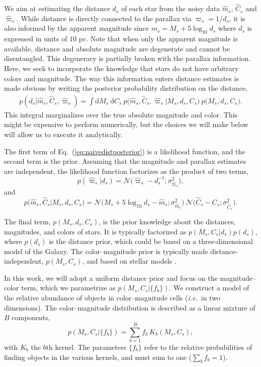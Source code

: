 \documentclass[manuscript, letterpaper]{aastex6}
\newcommand{\ie}{{\textit{i.e.}~}}
\newcommand{\eg}{{\textit{e.g.},~}}
\newcommand{\equref}[1]{{\xspace}Eq.~(\ref{#1})}
\renewcommand{\d}{{\mathrm{d}}}
\newcommand{\equ}[1]{\begin{equation}#1\end{equation}}
\newcommand{\eqn}[1]{\begin{eqnarray}#1\end{eqnarray}}
\begin{document}
We aim at estimating the distance $d_s$ of each star from the noisy data $\hat{m}_s$,  $\hat{C}_s$ and $\hat{\varpi}_s$. 
While distance is directly connected to the parallax via $\varpi_s=1/d_s$, it is also informed by the apparent magnitude since $m_s = M_s + 5\log_{10} d_s$ where $d_s$ is expressed in units of $10$ pc.
Note that when only the apparent magnitude is available, distance and absolute magnitude are degenerate and cannot be disentangled. 
This degeneracy is partially broken with the parallax information.
Here, we seek to incorporate the knowledge that stars do not have arbitrary colors and magnitude.
The way this information enters distance estimates is made obvious by writing the posterior probability distribution on the distance,
\eqn{
	p(d_s | \hat{m}_s, \hat{C}_s, \hat{\varpi}_s) = \int \d M_s \ \d C_s \ p\bigl(\hat{m}_s, \hat{C}_s, \hat{\varpi}_s \bigr\rvert M_s, d_s, C_s\bigr) \ p\bigl( M_s, d_s, C_s \bigr) \label{eq:naivedistposterior}.
}
This integral marginalizes over the true absolute magnitude and color.
This might be expensive to perform numerically, but the choices we will make below will allow us to execute it analytically.

The first term of \equref{eq:naivedistposterior} is a likelihood function, and the second term is the prior. 
Assuming that the magnitude and parallax estimates are independent, the likelihood function factorizes as the product of two terms, 
\equ{
	p\left(\hat{\varpi}_s \bigr\rvert d_s\right) = \mathcal{N}\bigl(\hat{\varpi}_s - d_s^{-1};\sigma_{\hat{\varpi}_s}^2 \bigr),\label{eq:parallaxlike}
}
and
\equ{
	p\bigl(\hat{m}_s, \hat{C}_s \bigr\rvert M_s, d_s, C_s\bigr)  =  \mathcal{N}\bigl( M_s + 5\log_{10}d_s  -\hat{m}_s ;\sigma_{\hat{m}_s}^2 \bigr) \  \mathcal{N}\bigl(\hat{C}_s - C_s;\sigma_{\hat{C}_s}^2 \bigr).
}

The final term, $ p( M_s, d_s, C_s ) $, is the prior knowledge about the distances, magnitudes, and colors of stars. 
It is typically factorized as $p( M_s, C_s | d_s) p (d_s)$, where $p (d_s)$ is the distance prior, which could be based on a three-dimensional model of the Galaxy. 
The color--magnitude prior is typically made distance-independent, $p( M_s, C_s )$, and based on stellar models \citep[\eg][]{Astraatmadja22016, Astraatmadja2016}. 

In this work, we will adopt a uniform distance prior and focus on the magnitude--color term, which we parametrize as $p\left(M_s, C_s  \bigr\rvert \{ f_{b} \} \right) $.
We construct a model of the relative abundance of objects in color--magnitude cells (\ie in two dimensions).
The color--magnitude distribution is described as a linear mixture of $B$ components,
\equ{
	p\left(M_s, C_s  \bigr\rvert \{ f_{b} \} \right) = \sum_{b=1}^B f_b \ K_b(M_s, C_s),\label{eq:cmd}
} 
with $K_b$ the  $b$th kernel. 
The parameters $\{ f_{b} \}$ refer to the relative probabilities of finding objects in the various kernels, and must sum to one ($\sum_b f_b = 1$).
\end{document}
